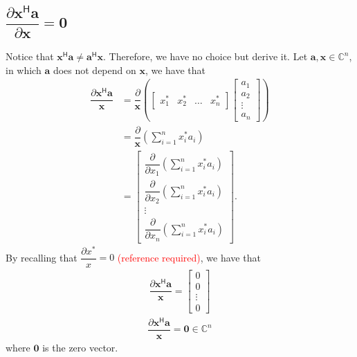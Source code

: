 \documentclass{article}
\newcommand{\hermit}{\mathsf{H}}
\newcommand{\obs}[1]{\textcolor{red}{(#1)}}
\begin{document}
\subsection{\(\dfrac{\partial \mathbf{x}^\hermit \mathbf{a}}{\partial \mathbf{x}} = \mathbf{0}\)}
Notice that \(\mathbf{x}^\hermit \mathbf{a} \neq \mathbf{a}^\hermit \mathbf{x}\). Therefore, we have no choice but derive it. Let \(\mathbf{a, x} \in \mathbb{C}^{n}\), in which \(\mathbf{a}\) does not depend on \(\mathbf{x}\), we have that
\begin{align}
    \dfrac{\partial \mathbf{x}^\hermit \mathbf{a}}{\mathbf{x}} & = \dfrac{\partial}{\mathbf{x}} \left(
    \begin{bmatrix}
        x^*_1 & x^*_2 & \dots & x^*_n
    \end{bmatrix} \begin{bmatrix}
        a_{1} \\ a_{2} \\ \vdots \\ a_{n}
    \end{bmatrix} \right) \\
    & = \dfrac{\partial}{\mathbf{x}} \left( \sum_{i = 1}^n x^*_ia_i \right) \\
    &= \begin{bmatrix}
            \dfrac{\partial}{\partial x_1} \left( \sum_{i = 1}^n x^*_ia_i \right) \\ \dfrac{\partial}{\partial x_2} \left( \sum_{i = 1}^n x^*_ia_i \right) \\ \vdots \\
            \dfrac{\partial}{\partial x_n} \left( \sum_{i = 1}^n x^*_ia_i \right)
        \end{bmatrix}.
\end{align}
By recalling that \(\dfrac{\partial x^*}{x} = 0\) \obs{reference required}, we have that
\begin{align}
    \dfrac{\partial \mathbf{x}^\hermit \mathbf{a}}{\mathbf{x}} = \begin{bmatrix}
        0 \\ 0 \\ \vdots \\ 0
    \end{bmatrix}
\end{align}
\begin{align}
    \boxed{\dfrac{\partial \mathbf{x}^\hermit \mathbf{a}}{\mathbf{x}} = \mathbf{0} \in \mathbb{C}^{n}}
\end{align}
where \(\mathbf{0}\) is the zero vector.
\end{document}
